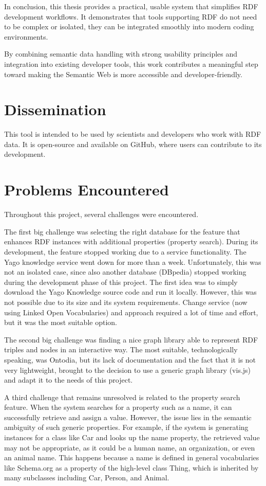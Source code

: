 In conclusion, this thesis provides a practical, usable system that simplifies RDF development workflows. It demonstrates that tools supporting RDF do not need to be complex or isolated, they can be integrated smoothly into modern coding environments. 

By combining semantic data handling with strong usability principles and integration into existing developer tools, this work contributes a meaningful step toward making the Semantic Web is more accessible and developer-friendly.

\section{Dissemination\label{sec:dissemination}}

This tool is intended to be used by scientists and developers who work with RDF data. It is open-source and available on GitHub, where users can contribute to its development. 


\section{Problems Encountered\label{sec:problems}}

Throughout this project, several challenges were encountered.

The first big challenge was selecting the right database for the feature that enhances RDF instances with additional properties (property search).
During its development, the feature stopped working due to a service functionality. The Yago knowledge service went down for more than a week. 
Unfortunately, this was not an isolated case, since also another database (DBpedia) stopped working during the development phase of this project. 
The first idea was to simply download the Yago Knowledge source code and run it locally. However, this was not possible due to its size and its system requirements. 
Change service (now using Linked Open Vocabularies) and approach required a lot of time and effort, but it was the most suitable option. 

The second big challenge was finding a nice graph library able to represent RDF triples and nodes in an interactive way. 
The most suitable, technologically speaking, was Ontodia, but its lack of documentation and the fact that it is not very lightweight, brought to the decision to use a generic graph library (vis.js) and adapt it to the needs of this project.

A third challenge that remains unresolved is related to the property search feature. When the system searches for a property such as a name, it can successfully retrieve and assign a value. However, the issue lies in the semantic ambiguity of such generic properties. For example, if the system is generating instances for a class like Car and looks up the name property, the retrieved value may not be appropriate, as it could be a human name, an organization, or even an animal name. This happens because a name is defined in general vocabularies like Schema.org as a property of the high-level class Thing, which is inherited by many subclasses including Car, Person, and Animal.

